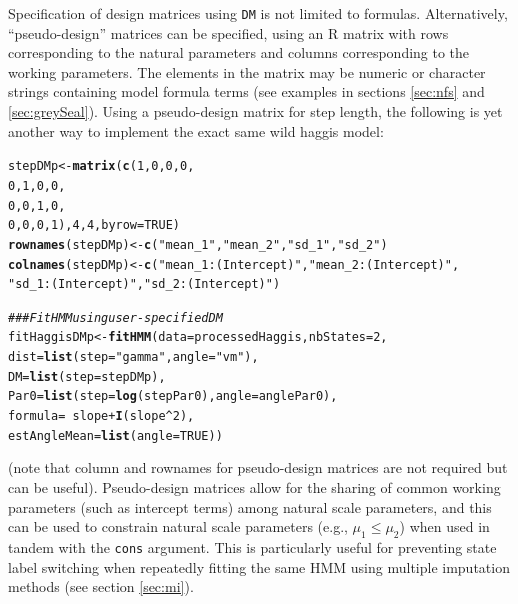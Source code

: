 \documentclass[12pt]{article}\usepackage[]{graphicx}\usepackage[]{color}
\makeatletter
\newcommand{\hlnum}[1]{\textcolor[rgb]{0.686,0.059,0.569}{#1}}%
\newcommand{\hlstr}[1]{\textcolor[rgb]{0.192,0.494,0.8}{#1}}%
\newcommand{\hlcom}[1]{\textcolor[rgb]{0.678,0.584,0.686}{\textit{#1}}}%
\newcommand{\hlopt}[1]{\textcolor[rgb]{0,0,0}{#1}}%
\newcommand{\hlstd}[1]{\textcolor[rgb]{0.345,0.345,0.345}{#1}}%
\newcommand{\hlkwb}[1]{\textcolor[rgb]{0.69,0.353,0.396}{#1}}%
\newcommand{\hlkwc}[1]{\textcolor[rgb]{0.333,0.667,0.333}{#1}}%
\newcommand{\hlkwd}[1]{\textcolor[rgb]{0.737,0.353,0.396}{\textbf{#1}}}%
\newenvironment{kframe}{%
 \def\at@end@of@kframe{}%
 \ifinner\ifhmode%
  \def\at@end@of@kframe{\end{minipage}}%
  \begin{minipage}{\columnwidth}%
 \fi\fi%
 \def\FrameCommand##1{\hskip\@totalleftmargin \hskip-\fboxsep
 \colorbox{shadecolor}{##1}\hskip-\fboxsep
     \hskip-\linewidth \hskip-\@totalleftmargin \hskip\columnwidth}%
 \MakeFramed {\advance\hsize-\width
   \@totalleftmargin\z@ \linewidth\hsize
   \@setminipage}}%
 {\par\unskip\endMakeFramed%
 \at@end@of@kframe}
\newenvironment{knitrout}{}{} %
\makeatother
\begin{document}
Specification of design matrices using \verb|DM| is not limited to formulas. Alternatively, ``pseudo-design'' matrices can be specified, using an R matrix with rows corresponding to the natural parameters and columns corresponding to the working parameters. The elements in the matrix may be numeric or character strings containing model formula terms (see examples in sections \ref{sec:nfs} and \ref{sec:greySeal}). Using a pseudo-design matrix for step length, the following is yet another way to implement the exact same wild haggis model:
\begin{knitrout}
\color{fgcolor}\begin{kframe}
\begin{alltt}
\hlstd{stepDMp} \hlkwb{<-} \hlkwd{matrix}\hlstd{(}\hlkwd{c}\hlstd{(}\hlnum{1}\hlstd{,}\hlnum{0}\hlstd{,}\hlnum{0}\hlstd{,}\hlnum{0}\hlstd{,}
                   \hlnum{0}\hlstd{,}\hlnum{1}\hlstd{,}\hlnum{0}\hlstd{,}\hlnum{0}\hlstd{,}
                   \hlnum{0}\hlstd{,}\hlnum{0}\hlstd{,}\hlnum{1}\hlstd{,}\hlnum{0}\hlstd{,}
                   \hlnum{0}\hlstd{,}\hlnum{0}\hlstd{,}\hlnum{0}\hlstd{,}\hlnum{1}\hlstd{),}\hlnum{4}\hlstd{,}\hlnum{4}\hlstd{,}\hlkwc{byrow}\hlstd{=}\hlnum{TRUE}\hlstd{)}
\hlkwd{rownames}\hlstd{(stepDMp)} \hlkwb{<-} \hlkwd{c}\hlstd{(}\hlstr{"mean_1"}\hlstd{,}\hlstr{"mean_2"}\hlstd{,}\hlstr{"sd_1"}\hlstd{,}\hlstr{"sd_2"}\hlstd{)}
\hlkwd{colnames}\hlstd{(stepDMp)} \hlkwb{<-} \hlkwd{c}\hlstd{(}\hlstr{"mean_1:(Intercept)"}\hlstd{,}\hlstr{"mean_2:(Intercept)"}\hlstd{,}
                      \hlstr{"sd_1:(Intercept)"}\hlstd{,}\hlstr{"sd_2:(Intercept)"}\hlstd{)}

\hlcom{### Fit HMM	using user-specified DM}
\hlstd{fitHaggisDMp} \hlkwb{<-} \hlkwd{fitHMM}\hlstd{(}\hlkwc{data} \hlstd{= processedHaggis,} \hlkwc{nbStates} \hlstd{=} \hlnum{2}\hlstd{,}
                       \hlkwc{dist} \hlstd{=} \hlkwd{list}\hlstd{(}\hlkwc{step} \hlstd{=} \hlstr{"gamma"}\hlstd{,} \hlkwc{angle} \hlstd{=} \hlstr{"vm"}\hlstd{),}
                       \hlkwc{DM} \hlstd{=} \hlkwd{list}\hlstd{(}\hlkwc{step} \hlstd{= stepDMp),}
                       \hlkwc{Par0} \hlstd{=} \hlkwd{list}\hlstd{(}\hlkwc{step} \hlstd{=} \hlkwd{log}\hlstd{(stepPar0),} \hlkwc{angle} \hlstd{= anglePar0),}
                       \hlkwc{formula} \hlstd{=} \hlopt{~} \hlstd{slope} \hlopt{+} \hlkwd{I}\hlstd{(slope}\hlopt{^}\hlnum{2}\hlstd{),}
                       \hlkwc{estAngleMean} \hlstd{=} \hlkwd{list}\hlstd{(}\hlkwc{angle}\hlstd{=}\hlnum{TRUE}\hlstd{))}
\end{alltt}
\end{kframe}
\end{knitrout}
(note that column and rownames for pseudo-design matrices are not required but can be useful). Pseudo-design matrices allow for the sharing of common working parameters (such as intercept terms) among natural scale parameters, and this can be used to constrain natural scale parameters (e.g., $\mu_1 \le \mu_2$) when used in tandem with the \verb|cons| argument.  This is particularly useful for preventing state label switching when repeatedly fitting the same HMM using multiple imputation methods (see section \ref{sec:mi}).
\end{document}
